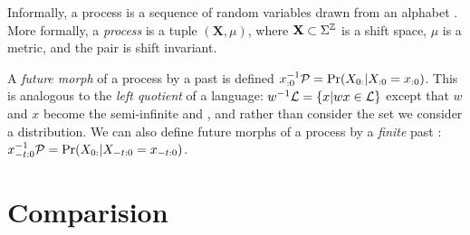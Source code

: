 \documentclass[prl,twocolumn,showpacs,superscriptaddress,preprintnumbers,floatfix]{revtex4-1}
\theoremstyle{plain}    \newtheorem{Lem}{Lemma}
\theoremstyle{plain}    \newtheorem*{ProLem}{Proof}
\theoremstyle{plain}    \newtheorem{Cor}{Corollary}
\theoremstyle{plain}    \newtheorem*{ProCor}{Proof}
\theoremstyle{plain}    \newtheorem{The}{Theorem}
\theoremstyle{plain}    \newtheorem*{ProThe}{Proof}
\theoremstyle{plain}    \newtheorem{Prop}{Proposition}
\theoremstyle{plain}    \newtheorem*{ProProp}{Proof}
\theoremstyle{plain}    \newtheorem*{Conj}{Conjecture}
\theoremstyle{plain}    \newtheorem*{Rem}{Remark}
\theoremstyle{plain}    \newtheorem{Def}{Definition}
\theoremstyle{plain}    \newtheorem*{Not}{Notation}
\begin{document}
Informally, a process is a sequence of random variables drawn from an alphabet
\MeasAlphabet. More formally, a \emph{process} \Process is a tuple $(\mathbf{X},
\mu)$, where $\mathbf{X} \subset \Sigma^\mathbb{Z}$ is a shift space,
$\mu$ is a metric, and the pair is shift invariant.

A \emph{future morph} of a process \Process by a past \past is defined
${x}_{:0}^{-1}\mathcal{P} = \Pr({X}_{0:} | {X}_{:0} = {x}_{:0})$. This is analogous to the
\emph{left quotient} of a language: $w^{-1}\mathcal{L} = \{ x | wx \in \mathcal{L}
\}$ except that $w$ and $x$ become the semi-infinite \past and \future, and
rather than consider the set we consider a distribution. We can also define
future morphs of a process by a \emph{finite} past :
${x}_{-t:0}^{-1}\mathcal{P} = \Pr({X}_{0:} | {X}_{-t:0} = {x}_{-t:0})$.

\section{Comparision}
\label{sec:comparison}
\end{document}
